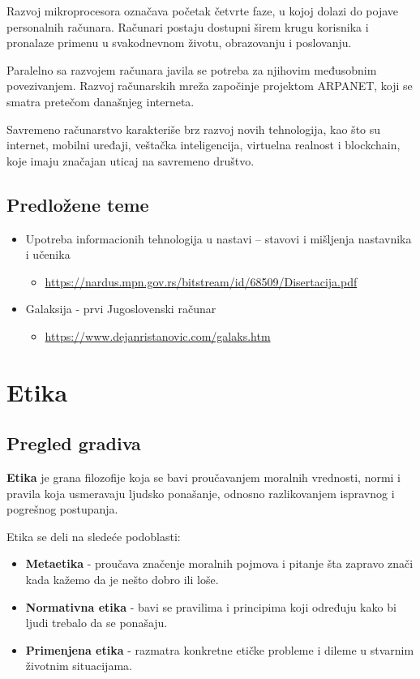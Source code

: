 \documentclass[a4paper, 12pt]{article}
\begin{document}
Razvoj mikroprocesora označava početak četvrte faze, u kojoj dolazi do pojave personalnih
računara. Računari postaju dostupni širem krugu korisnika i pronalaze primenu u svakodnevnom
životu, obrazovanju i poslovanju.

Paralelno sa razvojem računara javila se potreba za njihovim međusobnim povezivanjem.
Razvoj računarskih mreža započinje projektom ARPANET, koji se smatra pretečom današnjeg
interneta. 

Savremeno računarstvo karakteriše brz razvoj novih tehnologija, kao što su
internet, mobilni uređaji, veštačka inteligencija, virtuelna realnost i blockchain, koje
imaju značajan uticaj na savremeno društvo.

\subsection{Predložene teme}
\begin{itemize}
    \item Upotreba informacionih tehnologija u nastavi – stavovi i mišljenja nastavnika i učenika
    \begin{itemize}
        \item \url{https://nardus.mpn.gov.rs/bitstream/id/68509/Disertacija.pdf}
    \end{itemize}
    \item Galaksija - prvi Jugoslovenski računar
    \begin{itemize}
        \item \url{https://www.dejanristanovic.com/galaks.htm}
    \end{itemize}
    
\end{itemize}

\section{Etika}
\subsection{Pregled gradiva}
\textbf{Etika} je grana filozofije koja se bavi proučavanjem moralnih vrednosti, normi i pravila
koja usmeravaju ljudsko ponašanje, odnosno razlikovanjem ispravnog i pogrešnog
postupanja.

Etika se deli na sledeće podoblasti:
\begin{itemize}
    \item \textbf{Metaetika} - proučava značenje moralnih pojmova i pitanje šta zapravo
    znači kada kažemo da je nešto dobro ili loše.
    \item \textbf{Normativna etika} - bavi se pravilima i principima koji određuju kako bi
    ljudi trebalo da se ponašaju.
    \item \textbf{Primenjena etika} - razmatra konkretne etičke probleme i dileme u
    stvarnim životnim situacijama.
\end{itemize}
\end{document}
